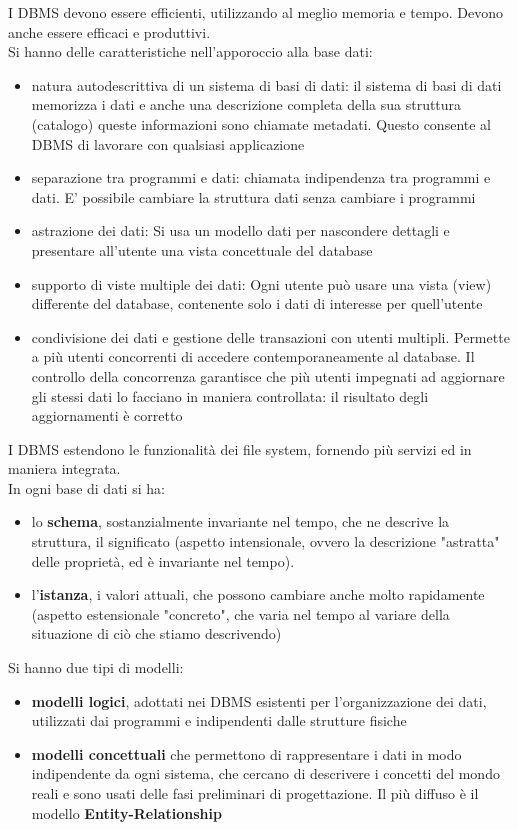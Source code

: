 \documentclass[a4paper,12pt, oneside]{book}
\begin{document}
I DBMS devono essere efficienti, utilizzando al meglio memoria e tempo. Devono anche essere efficaci e produttivi. \\
Si hanno delle caratteristiche nell'apporoccio alla base dati:
\begin{itemize}
\item natura autodescrittiva di un sistema di basi
di dati: il sistema di basi di dati memorizza i dati e
anche una descrizione completa della sua
struttura (catalogo) queste informazioni sono
chiamate metadati. Questo consente al DBMS di
lavorare con qualsiasi applicazione
\item separazione tra programmi e dati: chiamata
indipendenza tra programmi e dati. E’ possibile
cambiare la struttura dati senza cambiare i
programmi
\item astrazione dei dati: Si usa un modello dati
per nascondere dettagli e presentare all'utente
una vista concettuale del database
\item supporto di viste multiple dei dati: Ogni
utente può usare una vista (view) differente del
database, contenente solo i dati di interesse per
quell'utente
\item condivisione dei dati e gestione delle
transazioni con utenti multipli. Permette a più
utenti concorrenti di accedere contemporaneamente
al database. Il controllo della concorrenza
garantisce che più utenti impegnati ad aggiornare gli
stessi dati lo facciano in maniera controllata: il
risultato degli aggiornamenti è corretto
\end{itemize}
I DBMS estendono le funzionalità dei file
system, fornendo più servizi ed in maniera integrata.
\\In ogni base di dati si ha:
\begin{itemize}
\item lo \textbf{schema}, sostanzialmente invariante nel
tempo, che ne descrive la struttura, il
significato (aspetto intensionale, ovvero la descrizione
"astratta" delle proprietà, ed è invariante
nel tempo).
\item l'\textbf{istanza}, i valori attuali, che possono
cambiare anche molto rapidamente (aspetto estensionale "concreto", che varia nel
tempo al variare della situazione di ciò
che stiamo descrivendo)
\end{itemize}
Si hanno due tipi di modelli:
\begin{itemize}
\item \textbf{modelli logici}, adottati nei DBMS esistenti per l'organizzazione dei dati, utilizzati dai programmi e indipendenti dalle strutture fisiche
\item \textbf{modelli concettuali} che permettono di rappresentare i dati in modo indipendente da ogni sistema, che cercano di descrivere i concetti del mondo reali e sono usati delle fasi preliminari di progettazione. Il più diffuso è il modello \textbf{Entity-Relationship}
\end{itemize}
\end{document}
